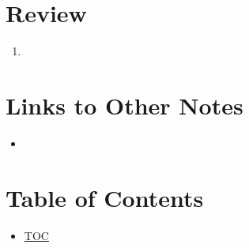 \section*{Review}
\begin{enumerate}
  \item 
\end{enumerate}


\section*{Links to Other Notes}
\begin{itemize}
  \item \hyperref[]{}
\end{itemize}

\section*{Table of Contents}

\begin{itemize}
  \item \hyperref[toc]{TOC}
\end{itemize}

